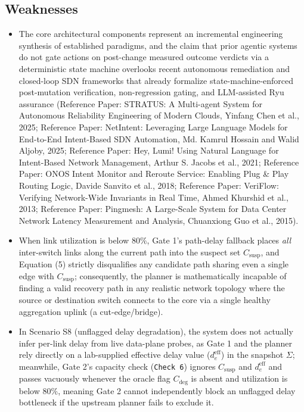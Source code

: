 \documentclass[11pt,a4paper]{article}
\begin{document}
\subsection*{Weaknesses}
\begin{itemize}[leftmargin=1.8em,itemsep=2pt]
\item The core architectural components represent an incremental engineering synthesis of established paradigms, and the claim that prior agentic systems do not gate actions on post-change measured outcome verdicts via a deterministic state machine overlooks recent autonomous remediation and closed-loop SDN frameworks that already formalize state-machine-enforced post-mutation verification, non-regression gating, and LLM-assisted Ryu assurance (Reference Paper: STRATUS: A Multi-agent System for Autonomous Reliability Engineering of Modern Clouds, Yinfang Chen et al., 2025; Reference Paper: NetIntent: Leveraging Large Language Models for End-to-End Intent-Based SDN Automation, Md. Kamrul Hossain and Walid Aljoby, 2025; Reference Paper: Hey, Lumi! Using Natural Language for Intent-Based Network Management, Arthur S. Jacobs et al., 2021; Reference Paper: ONOS Intent Monitor and Reroute Service: Enabling Plug \& Play Routing Logic, Davide Sanvito et al., 2018; Reference Paper: VeriFlow: Verifying Network-Wide Invariants in Real Time, Ahmed Khurshid et al., 2013; Reference Paper: Pingmesh: A Large-Scale System for Data Center Network Latency Measurement and Analysis, Chuanxiong Guo et al., 2015).
\item When link utilization is below $80\%$, Gate 1's path-delay fallback places \emph{all} inter-switch links along the current path into the suspect set $C_{\text{susp}}$, and Equation (5) strictly disqualifies any candidate path sharing even a single edge with $C_{\text{susp}}$; consequently, the planner is mathematically incapable of finding a valid recovery path in any realistic network topology where the source or destination switch connects to the core via a single healthy aggregation uplink (a cut-edge/bridge).
\item In Scenario S8 (unflagged delay degradation), the system does not actually infer per-link delay from live data-plane probes, as Gate 1 and the planner rely directly on a lab-supplied effective delay value ($d_e^{\text{eff}}$) in the snapshot $\Sigma$; meanwhile, Gate 2's capacity check (\texttt{Check 6}) ignores $C_{\text{susp}}$ and $d_e^{\text{eff}}$ and passes vacuously whenever the oracle flag $C_{\text{deg}}$ is absent and utilization is below $80\%$, meaning Gate 2 cannot independently block an unflagged delay bottleneck if the upstream planner fails to exclude it.

\end{itemize}
\end{document}
